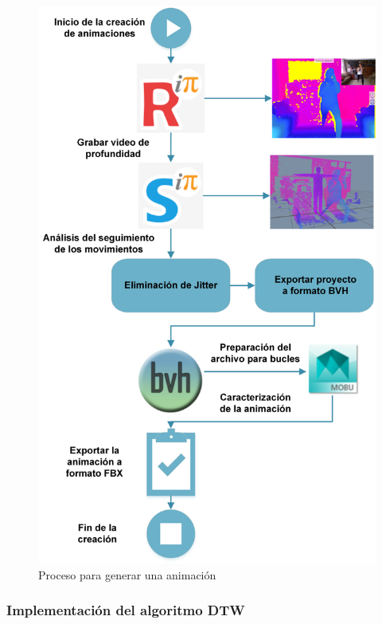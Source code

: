 \begin{figure}[H]%
	\begin{center}
		\includegraphics[scale=0.8]{./Figuras/Implementacion/Animaciones}
	\end{center}
	\caption{Proceso para generar una animación}
	\label{fig:Animaciones}
\end{figure}

\clearpage
\subsubsection{Implementación del algoritmo DTW}

